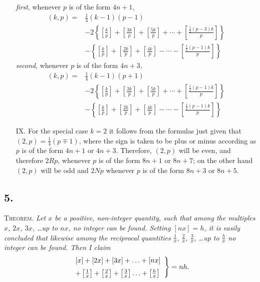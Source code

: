 \documentclass[14pt]{memoir}
\theoremstyle{plain}
\theoremstyle{remark}
\begin{document}
\begin{enumerate}
 \;\; \emph{first}, whenever $p$ is of the form $4n+1$,
 \begin{align*} (k,p) =& \tfrac{1}{4}(k-1)(p-1) \\
&-2\left\{ \left[ \tfrac{k}{p} \right] + \left[ \tfrac{3k}{p} \right] + \left[ \tfrac{5k}{p} \right] + \cdots + \left[ \tfrac{\frac{1}{2}(p-3)k}{p} \right]    \right\} \\
&- \left\{ \left[ \tfrac{k}{p} \right] + \left[ \tfrac{2k}{p} \right] + \left[ \tfrac{4k}{p} \right] - \cdots - \left[ \tfrac{\frac{1}{2}(p-1)k}{p} \right] \right\} \end{align*}
 \;\; \emph{second}, whenever $p$ is of the form $4n+3$,
 \begin{align*} (k,p) =& \tfrac{1}{4}(k-1)(p+1) \\
&-2\left\{ \left[ \tfrac{k}{p} \right] + \left[ \tfrac{3k}{p} \right] + \left[ \tfrac{5k}{p} \right] + \cdots + \left[ \tfrac{\tfrac{1}{2}(p-1)k}{p} \right]    \right\} \\
&- \left\{ \left[ \tfrac{k}{p} \right] + \left[ \tfrac{2k}{p} \right] + \left[ \tfrac{4k}{p} \right] - \cdots - \left[ \tfrac{\frac{1}{2}(p-1)k}{p} \right] \right\} \end{align*}

\item[IX.] For the special case $k=2$ it follows from the formulas just given that $(2,p) = \tfrac{1}{4}(p\mp 1)$, where the sign is taken to be plus or minus according as $p$ is of the form $4n+1$ or $4n+3$.   Therefore, $(2,p)$ will be even, and therefore $2Rp$, whenever $p$ is of the form $8n+1$ or $8n + 7$; on the other hand $(2,p)$ will be odd and $2Np$ whenever $p$ is of the form $8n+3$ or $8n+5$.
\end{enumerate}

\subsection*{5.}

\textsc{Theorem}. \textit{ Let $x$ be a positive, non-integer quantity, such that among the multiples $x$, $2x$, $3x$, \dots up to $nx$, no integer can be found.   Setting $[nx] = h$, it is easily concluded that likewise among the reciprocal quantities $\tfrac{1}{x}$, $\tfrac{2}{x}$, $\tfrac{3}{x}$, \dots up to $\tfrac{h}{x}$ no integer can be found.  Then I claim
\[ \left. \begin{array}{l} [x] + [2x] + [3x] + \ldots + [nx] \vspace{2mm} \\ + \left[\tfrac{1}{x}\right] + \left[ \tfrac{2}{x} \right] + \left[\tfrac{3}{x} \right] \ldots + \left[\tfrac{h}{x}\right] \end{array} \right\} = nh . \]}
\end{document}
